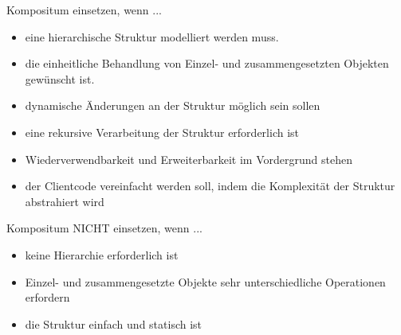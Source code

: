 

\begin{frame}{Kompositum einsetzen, wenn ...}
	\begin{itemize}
 		\item eine hierarchische Struktur modelliert werden muss.
 		\item die einheitliche Behandlung von Einzel- und zusammengesetzten Objekten gewünscht ist.
 		\item dynamische Änderungen an der Struktur möglich sein sollen
        \item eine rekursive Verarbeitung der Struktur erforderlich ist
        \item Wiederverwendbarkeit und Erweiterbarkeit im Vordergrund stehen
        \item der Clientcode vereinfacht werden soll, indem die Komplexität der Struktur abstrahiert wird
 	\end{itemize}
\end{frame}

\begin{frame}{Kompositum NICHT einsetzen, wenn ...}
	\begin{itemize}
 		\item keine Hierarchie erforderlich ist
 		\item Einzel- und zusammengesetzte Objekte sehr unterschiedliche Operationen erfordern\textbf{}
 		\item die Struktur einfach und statisch ist
 	\end{itemize}
\end{frame}
